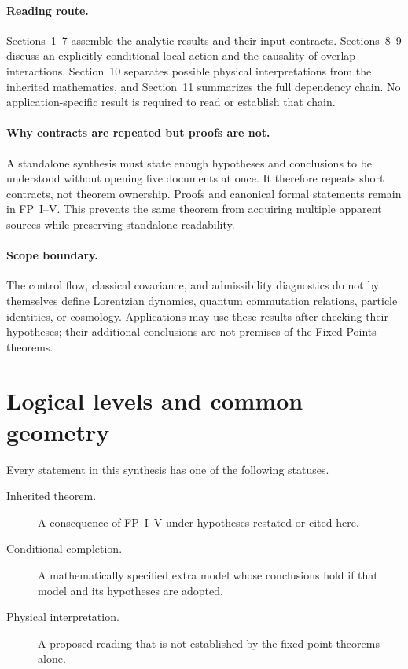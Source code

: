 \documentclass[11pt]{article}
\begin{document}
\paragraph{Reading route.}
Sections~1--7 assemble the analytic results and their input contracts.
Sections~8--9 discuss an explicitly conditional local action and the
causality of overlap interactions. Section~10 separates possible physical
interpretations from the inherited mathematics, and Section~11 summarizes
the full dependency chain. No application-specific result is required to
read or establish that chain.

\paragraph{Why contracts are repeated but proofs are not.}
A standalone synthesis must state enough hypotheses and conclusions to be
understood without opening five documents at once.  It therefore repeats
short contracts, not theorem ownership.  Proofs and canonical formal
statements remain in FP~I--V.  This prevents the same theorem from acquiring
multiple apparent sources while preserving standalone readability.

\paragraph{Scope boundary.}
The control flow, classical covariance, and admissibility diagnostics do not
by themselves define Lorentzian dynamics, quantum commutation relations,
particle identities, or cosmology. Applications may use these results after
checking their hypotheses; their additional conclusions are not premises
of the Fixed Points theorems.

\tableofcontents

\section{Logical levels and common geometry}

Every statement in this synthesis has one of the following statuses.
\begin{description}
\item[Inherited theorem.] A consequence of FP~I--V under hypotheses restated
or cited here.
\item[Conditional completion.] A mathematically specified extra model whose
conclusions hold if that model and its hypotheses are adopted.
\item[Physical interpretation.] A proposed reading that is not established by
the fixed-point theorems alone.
\end{description}
\end{document}
